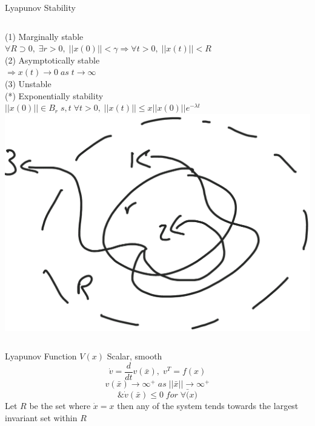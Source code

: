 \documentclass{beamer}
\begin{document}
\begin{frame}{Lyapunov Stability}
    \begin{columns}[T]
    \hspace{1cm}(1) Marginally stable\\
    $\forall R\supset 0,\; \exists r>0,\; ||x(0)||<\gamma \Rightarrow \forall t>0,\;||x(t)||<R$\\
    \hspace{1cm}(2) Asymptotically stable\\
    $\Rightarrow x(t)\rightarrow 0 \; as\; t\rightarrow \infty$\\
    \hspace{1cm}(3) Unstable\\
    \hspace{1cm}(*) Exponentially stability\\
    $||x(0)|| \in B_r \; s,t \; \forall t>0, \; ||x(t)||\leq x||x(0)||e^{-\lambda t}$
        \includegraphics[width=\textwidth]{fig/lyapunovStability.png}   
    \end{columns}
\end{frame}

\begin{frame}{Lyapunov Function}
$V(x)$ Scalar, smooth\\
$$\dot{v} = \frac{d}{dt}v(\bar{x}),\; v^T = f(x)$$
$$v(\bar{x})\rightarrow {\infty}^+ \; as\; ||\bar{x}|| \rightarrow {\infty}^+$$
$$\& \dot{v}(\bar{x}) \leq 0 \; for \; \forall \bar(x)$$
Let $R$ be the set where $\dot{x}=x$ then any of the system tends towards the largest invariant set within $R$ 
\end{frame}
\end{document}
